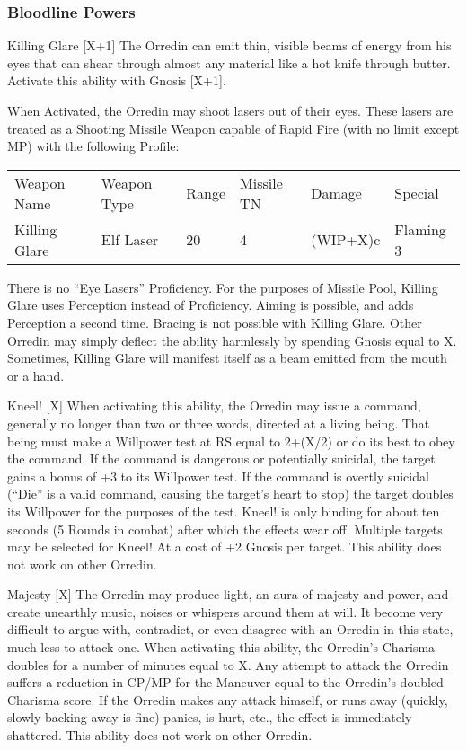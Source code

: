 \documentclass[oneside,11pt,english]{book}
\begin{document}
\subsubsection{Bloodline Powers}
Killing Glare [X+1] %
The Orredin can emit thin, visible beams of energy from his eyes that can shear through almost any 
material like a hot knife through butter. Activate this ability with Gnosis [X+1]. 


When Activated, the Orredin may shoot lasers out of their eyes. These lasers are treated as a Shooting 
Missile Weapon capable of Rapid Fire (with no limit except MP) with the following Profile: 
\begin{tabu} to \textwidth {XXX[-1,c]X[c]XX}
Weapon Name&Weapon Type&Range& Missile TN&Damage&Special\\
Killing Glare&Elf Laser&20&4&(WIP+X)c&Flaming 3\\
\end{tabu}
There is no “Eye Lasers” Proficiency. For the purposes of Missile Pool, Killing Glare uses Perception instead of Proficiency. Aiming is possible, and adds Perception a second time. Bracing is not possible with Killing Glare. 
Other Orredin may simply deflect the ability harmlessly by spending Gnosis equal to X. 
Sometimes, Killing Glare will manifest itself as a beam emitted from the mouth or a hand. 


Kneel! [X] %
When activating this ability, the Orredin may issue a command, generally no longer than two or three 
words, directed at a living being. That being must make a Willpower test at RS equal to 2+(X/2) or do its 
best to obey the command. If the command is dangerous or potentially suicidal, the target gains a bonus 
of +3 to its Willpower test. If the command is overtly suicidal (“Die” is a valid command, causing the 
target’s heart to stop) the target doubles its Willpower for the purposes of the test. Kneel! is only binding 
for about ten seconds (5 Rounds in combat) after which the effects wear off. Multiple targets may be 
selected for Kneel! At a cost of +2 Gnosis per target. This ability does not work on other Orredin. 


Majesty [X] %
The Orredin may produce light, an aura of majesty and power, and create unearthly music, noises or 
whispers around them at will. It become very difficult to argue with, contradict, or even disagree with an 
Orredin in this state, much less to attack one. When activating this ability, the Orredin's Charisma doubles for a number of minutes equal to X. Any attempt to attack the Orredin suffers a reduction in CP/MP for 
the Maneuver equal to the Orredin's doubled Charisma score. 
If the Orredin makes any attack himself, or runs away (quickly, slowly backing away is fine) panics, is 
hurt, etc., the effect is immediately shattered. 
This ability does not work on other Orredin. 
\end{document}
